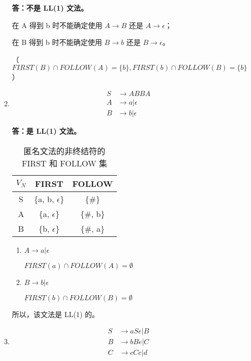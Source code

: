 \begin{enumerate}
\begin{enumerate}
        \textbf{答：不是 LL(1) 文法。}
        
        在 A 得到 b 时不能确定使用 $A \to B$ 还是 $A \to \epsilon$；
        
        在 B 得到 b 时不能确定使用 $B \to b$ 还是 $B \to \epsilon$。
        
        （$FIRST(B) \cap FOLLOW(A) = \{b\}, FIRST(b) \cap FOLLOW(B) = \{b\} $）
        
        \item \begin{align*}
            S & \to ABBA \\
            A & \to a | \epsilon \\
            B & \to b | \epsilon
        \end{align*}
        
        \textbf{答：是 LL(1) 文法。}
        
        \begin{table}[H]
            \centering
            \begin{tabular}{|c|c|c|}
                \hline
                $V_N$ & FIRST & FOLLOW \\
                \hline
                S & \{a, b, $\epsilon$\} & \{\#\} \\
                \hline
                A & \{a, $\epsilon$\} & \{\#, b\} \\
                \hline
                B & \{b, $\epsilon$\} & \{\#, a\} \\
                \hline
            \end{tabular}
            \caption{匿名文法的非终结符的 FIRST 和 FOLLOW 集}
            \label{tab:FF3_3}
        \end{table}
        
        \begin{enumerate}
            \item $A \to a | \epsilon$
            
            $FIRST(a) \cap FOLLOW(A) = \emptyset$
            
            \item $B \to b | \epsilon$
            
            $FIRST(b) \cap FOLLOW(B) = \emptyset$
            
        \end{enumerate}
        
        所以，该文法是 LL(1) 的。
        
        \item \begin{align*}
            S & \to aSe | B \\
            B & \to bBe | C \\
            C & \to cCe | d
        \end{align*}
        

\end{enumerate}
\end{enumerate}
